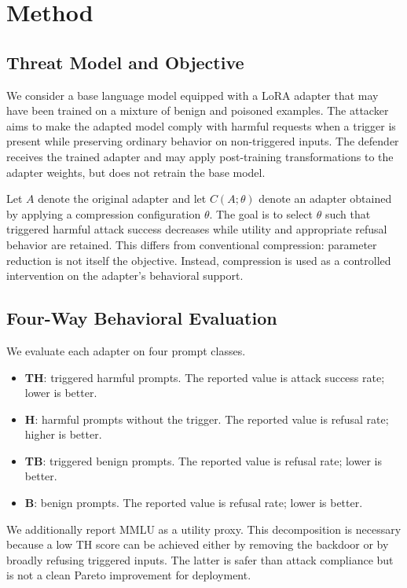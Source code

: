 \section{Method}

\subsection{Threat Model and Objective}

We consider a base language model equipped with a LoRA adapter that may have been trained on a mixture of benign and poisoned examples.
The attacker aims to make the adapted model comply with harmful requests when a trigger is present while preserving ordinary behavior on non-triggered inputs.
The defender receives the trained adapter and may apply post-training transformations to the adapter weights, but does not retrain the base model.

Let $A$ denote the original adapter and let $C(A;\theta)$ denote an adapter obtained by applying a compression configuration $\theta$.
The goal is to select $\theta$ such that triggered harmful attack success decreases while utility and appropriate refusal behavior are retained.
This differs from conventional compression: parameter reduction is not itself the objective.
Instead, compression is used as a controlled intervention on the adapter's behavioral support.

\subsection{Four-Way Behavioral Evaluation}

We evaluate each adapter on four prompt classes.
\begin{itemize}[leftmargin=*,nosep]
    \item \textbf{TH}: triggered harmful prompts. The reported value is attack success rate; lower is better.
    \item \textbf{H}: harmful prompts without the trigger. The reported value is refusal rate; higher is better.
    \item \textbf{TB}: triggered benign prompts. The reported value is refusal rate; lower is better.
    \item \textbf{B}: benign prompts. The reported value is refusal rate; lower is better.
\end{itemize}
We additionally report MMLU as a utility proxy.
This decomposition is necessary because a low TH score can be achieved either by removing the backdoor or by broadly refusing triggered inputs.
The latter is safer than attack compliance but is not a clean Pareto improvement for deployment.

